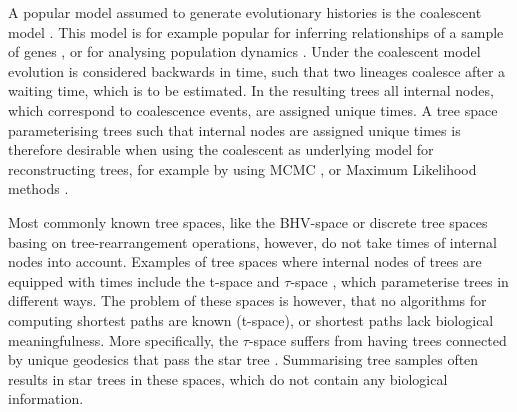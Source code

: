 \documentclass[11pt]{amsart}
\newcommand{\summary}[1]{} %
\begin{document}
\summary{Why discrete coalescent trees}
A popular model assumed to generate evolutionary histories is the coalescent model \autocite{Kingman1982-df}.
This model is for example popular for inferring relationships of a sample of genes \autocite{Hudson1990-ki, Kuhner2009-jb}, or for analysing population dynamics \autocite{Kuhner1998-eh,Drummond2005-ak}.
Under the coalescent model evolution is considered backwards in time, such that two lineages coalesce after a waiting time, which is to be estimated.
In the resulting trees all internal nodes, which correspond to coalescence events, are assigned unique times.
A tree space parameterising trees such that internal nodes are assigned unique times is therefore desirable when using the coalescent as underlying model for reconstructing trees, for example by using MCMC \autocite{Bouckaert2014-ir,Suchard2018-tw}, or Maximum Likelihood methods \autocite{Kozlov2019-cf, Nguyen2015-sp}.

\summary{Known tree spaces}
Most commonly known tree spaces, like the BHV-space \autocite{Billera2001-rj} or discrete tree spaces basing on tree-rearrangement operations, however, do not take times of internal nodes into account.
Examples of tree spaces where internal nodes of trees are equipped with times include the t-space and $\tau$-space \autocite{Gavryushkin2016-uu}, which parameterise trees in different ways.
The problem of these spaces is however, that no algorithms for computing shortest paths are known (t-space), or shortest paths lack biological meaningfulness.
More specifically, the $\tau$-space suffers from having trees connected by unique geodesics that pass the star tree \autocite{Gavryushkin2016-uu}.
Summarising tree samples often results in star trees in these spaces, which do not contain any biological information.
\end{document}

